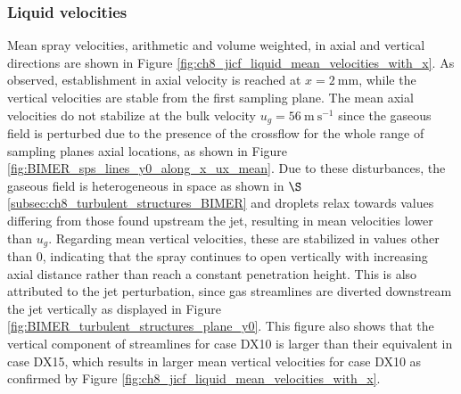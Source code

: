 \vspace*{-0.3in}

\subsubsection*{Liquid velocities}

Mean spray velocities, arithmetic and volume weighted, in axial and vertical directions are shown in Figure \ref{fig:ch8_jicf_liquid_mean_velocities_with_x}. As observed, establishment in axial velocity is reached at $x = 2~\mathrm{mm}$, while the vertical velocities are stable from the first sampling plane. The mean axial velocities do not stabilize at the bulk velocity $u_g = 56~\mathrm{m~s}^{-1}$ since the gaseous field is perturbed due to the presence of the crossflow for the whole range of sampling planes axial locations, as shown in Figure \ref{fig:BIMER_sps_lines_y0_along_x_ux_mean}.   Due to these disturbances, the gaseous field is heterogeneous in space as shown in $\S$\ref{subsec:ch8_turbulent_structures_BIMER} and droplets relax towards values differing from those found upstream the jet, resulting in mean velocities lower than $u_g$. Regarding mean vertical velocities, these are stabilized in values other than $0$, indicating that the spray continues to open vertically with increasing axial distance rather than reach a constant penetration height. This is also attributed to the jet perturbation, since gas streamlines are diverted downstream the jet vertically as displayed in Figure \ref{fig:BIMER_turbulent_structures_plane_y0}. This figure also shows that the vertical component of streamlines for case DX10 is larger than their equivalent in case DX15, which results in larger mean vertical velocities for case DX10 as confirmed by Figure \ref{fig:ch8_jicf_liquid_mean_velocities_with_x}.



